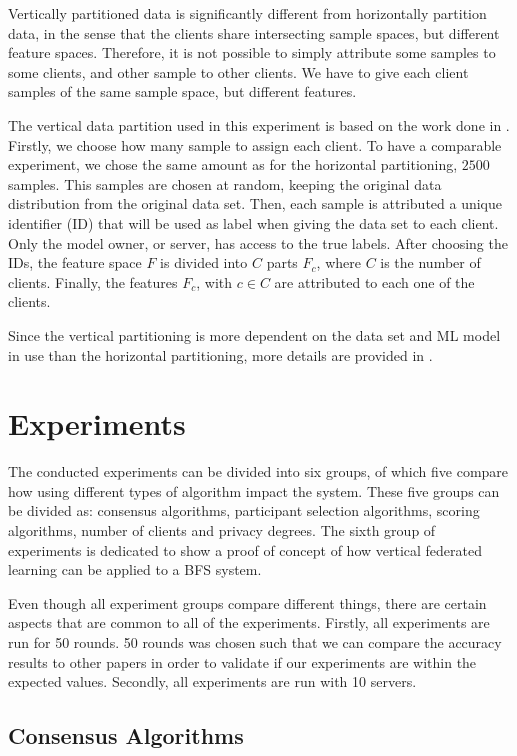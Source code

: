 Vertically partitioned data is significantly different from horizontally partition data, in the sense that the clients share intersecting sample spaces, but different feature spaces. Therefore, it is not possible to simply attribute some samples to some clients, and other sample to other clients. We have to give each client samples of the same sample space, but different features.

The vertical data partition used in this experiment is based on the work done in \cite{10.48550/arxiv.2104.00489}. Firstly, we choose how many sample to assign each client. To have a comparable experiment, we chose the same amount as for the horizontal partitioning, $2500$ samples. This samples are chosen at random, keeping the original data distribution from the original data set. Then, each sample is attributed a unique identifier (ID) that will be used as label when giving the data set to each client. Only the model owner, or server, has access to the true labels. After choosing the IDs, the feature space $F$ is divided into $C$ parts $F_c$, where $C$ is the number of clients. Finally, the features $F_c$, with $c \in C$ are attributed to each one of the clients.

Since the vertical partitioning is more dependent on the data set and ML model in use than the horizontal partitioning, more details are provided in .

\section{Experiments}\label{meth:experiments}

The conducted experiments can be divided into six groups, of which five compare how using different types of algorithm impact the system. These five groups can be divided as: consensus algorithms, participant selection algorithms, scoring algorithms, number of clients and privacy degrees. The sixth group of experiments is dedicated to show a proof of concept of how vertical federated learning can be applied to a BFS system.

Even though all experiment groups compare different things, there are certain aspects that are common to all of the experiments. Firstly, all experiments are run for 50 rounds. 50 rounds was chosen such that we can compare the accuracy results to other papers in order to validate if our experiments are within the expected values. Secondly, all experiments are run with 10 servers.

\subsection{Consensus Algorithms}

